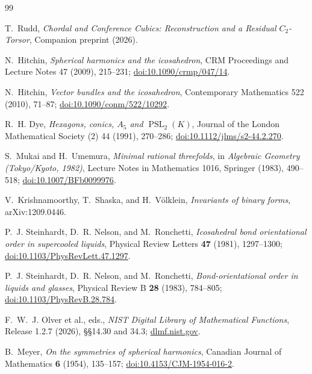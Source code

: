 \begin{thebibliography}{99}
\raggedright

T.~Rudd,
\emph{Chordal and Conference Cubics: Reconstruction and a Residual \(C_2\)-Torsor},
Companion preprint (2026).

N.~Hitchin,
\emph{Spherical harmonics and the icosahedron},
CRM Proceedings and Lecture Notes 47 (2009), 215--231;
\href{https://doi.org/10.1090/crmp/047/14}{doi:10.1090/crmp/047/14}.

N.~Hitchin,
\emph{Vector bundles and the icosahedron},
Contemporary Mathematics 522 (2010), 71--87;
\href{https://doi.org/10.1090/conm/522/10292}{doi:10.1090/conm/522/10292}.

R.~H. Dye,
\emph{Hexagons, conics, \(A_5\) and \(\operatorname{PSL}_2(K)\)},
Journal of the London Mathematical Society (2) 44 (1991), 270--286;
\href{https://doi.org/10.1112/jlms/s2-44.2.270}
{doi:10.1112/jlms/s2-44.2.270}.

S.~Mukai and H.~Umemura,
\emph{Minimal rational threefolds},
in \emph{Algebraic Geometry (Tokyo/Kyoto, 1982)},
Lecture Notes in Mathematics 1016, Springer (1983), 490--518;
\href{https://doi.org/10.1007/BFb0099976}{doi:10.1007/BFb0099976}.

V.~Krishnamoorthy, T.~Shaska, and H.~V\"olklein,
\emph{Invariants of binary forms},
arXiv:1209.0446.

P.~J. Steinhardt, D.~R. Nelson, and M.~Ronchetti,
\emph{Icosahedral bond orientational order in supercooled liquids},
Physical Review Letters \textbf{47} (1981), 1297--1300;
\href{https://doi.org/10.1103/PhysRevLett.47.1297}
{doi:10.1103/PhysRevLett.47.1297}.

P.~J. Steinhardt, D.~R. Nelson, and M.~Ronchetti,
\emph{Bond-orientational order in liquids and glasses},
Physical Review B \textbf{28} (1983), 784--805;
\href{https://doi.org/10.1103/PhysRevB.28.784}
{doi:10.1103/PhysRevB.28.784}.

F.~W.~J. Olver et al., eds.,
\emph{NIST Digital Library of Mathematical Functions},
Release 1.2.7 (2026), \S\S14.30 and 34.3;
\href{https://dlmf.nist.gov/}{dlmf.nist.gov}.

B.~Meyer,
\emph{On the symmetries of spherical harmonics},
Canadian Journal of Mathematics \textbf{6} (1954), 135--157;
\href{https://doi.org/10.4153/CJM-1954-016-2}
{doi:10.4153/CJM-1954-016-2}.


\end{thebibliography}
